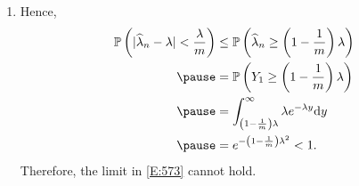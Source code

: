 \begin{frame}
\begin{enumerate}
 \item[] Hence,
\begin{align*}
\bbP\left(|\widehat\lambda_n -\lambda|<\frac{\lambda}{m}\right)
& \le \bbP\left(\widehat\lambda_n \ge \left(1-\frac{1}{m}\right)\lambda \right)\\ \pause
& = \bbP\left(Y_1\ge \left(1-\frac{1}{m}\right)\lambda \right)\\ \pause
&= \int_{\left(1-\frac{1}{m}\right)\lambda }^\infty \lambda e^{-\lambda y}\ud y\\ \pause
&= e^{-\left(1-\frac{1}{m}\right)\lambda^2}<1.
\end{align*}
Therefore, the limit in \eqref{E:573} cannot hold. \myEnd
\end{enumerate}
\end{frame}
